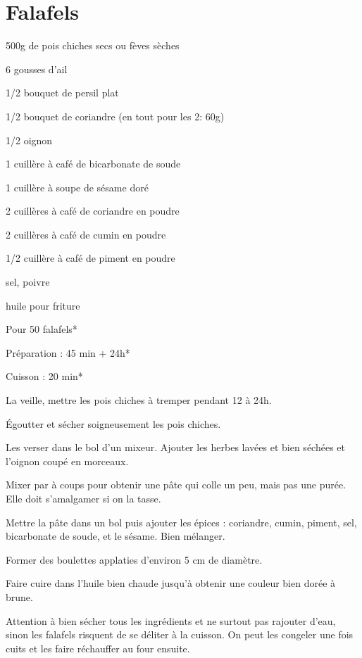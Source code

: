 \section{Falafels}

\begin{ingredients}
\item 500g de pois chiches secs ou fèves sèches
\item 6 gousses d'ail
\item 1/2 bouquet de persil plat
\item 1/2 bouquet de coriandre (en tout pour les 2: 60g)
\item 1/2 oignon
\item 1 cuillère à café de bicarbonate de soude
\item 1 cuillère à soupe de sésame doré
\item 2 cuillères à café de coriandre en poudre
\item 2 cuillères à café de cumin en poudre
\item 1/2 cuillère à café de piment en poudre
\item sel, poivre
\item huile pour friture
\end{ingredients}
\begin{infos}
\item Pour 50 falafels*		%
\item Préparation : 45 min + 24h*		%
\item Cuisson : 20 min*			%
\end{infos}
\begin{etapes}
\item La veille, mettre les pois chiches à tremper pendant 12 à 24h.
\item Égoutter et sécher soigneusement les pois chiches.
\item Les verser dans le bol d'un mixeur. Ajouter les herbes lavées et bien séchées et l'oignon coupé en morceaux.
\item Mixer par à coups pour obtenir une pâte qui colle un peu, mais pas une purée. Elle doit s'amalgamer si on la tasse.
\item Mettre la pâte dans un bol puis ajouter les épices : coriandre, cumin, piment, sel, bicarbonate de soude, et le sésame. Bien mélanger.
\item Former des boulettes applaties d'environ 5 cm de diamètre.
\item Faire cuire dans l'huile bien chaude jusqu'à obtenir une couleur bien dorée à brune.
\end{etapes}
\begin{conseils}
Attention à bien sécher tous les ingrédients et ne surtout pas rajouter d'eau, sinon les falafels risquent de se déliter à la cuisson.
On peut les congeler une fois cuits et les faire réchauffer au four ensuite.
\end{conseils}